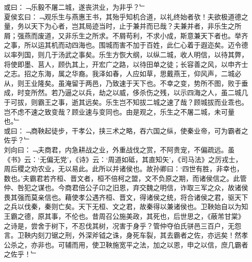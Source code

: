 或曰：﹁乐毅不屠二城，遂丧洪业，为非乎？﹂\\
夏侯玄曰：﹁观乐生与燕惠王书，其殆乎知机合道，以礼终始者欤！夫欲极道德之量，务以天下为心者，岂其局迹当时，止于兼并而已哉？夫兼并者，非乐生之所屑；强燕而废道，又非乐生之所求。不屑苟利，不求小成，斯意兼天下者也。举齐之事，所以运其机而动四海也。围城而害不加于百姓，此仁心着于遐迩矣。迈令德以率列国，则几于汤武之事矣。乐生方恢大纲，以纵二城，收人明信，以待其弊，将使即墨、莒人，顾仇其上，开宏广之路，以待田单之徒；长容善之风，以申齐士之志。招之东海，属之华裔。我泽如春，人应如草，思戴燕王，仰风声，二城必从，则王业隆矣。虽淹留于两邑，乃致速于天下也。不幸之变，势所不图，败于垂成，时变所然。若乃逼之以兵，劫之以威，侈杀伤之残，以示四海之人，虽二城几于可拔，则霸王之事，逝其远矣。乐生岂不知拔二城之速了哉？顾城拔而业乖也。岂不虑不速之致变哉？顾业速与变同也。由是观之，乐生之不屠二城，未可量也。﹂
\\
或曰：﹁商鞅起徒步，干孝公，挟三术之略，吞六国之纵，使秦业帝，可为霸者之佐乎？﹂\\
刘向曰：﹁夫商君，内急耕战之业，外重战伐之赏，不阿贵宠，不偏疏远。虽《书》云：‘无偏无党’，《诗》云：‘周道如砥，其直知矢’，《司马法》之厉戎士，周后稷之劝农业，无以易此。此所以并诸侯也。故孙卿曰：‘四世有胜，非幸也，数也。’夫霸君若齐桓、晋文者，桓不倍柯之盟，文不负原之期，而诸侯信之。此管仲、咎犯之谋也。今商君倍公子卬之旧恩，弃交魏之明信，诈取三军之众，故诸侯畏其强而莫亲信也。藉使孝公遇齐桓、晋文，得诸侯之统，将合诸侯之君，驱天下之兵以伐秦，秦则亡矣。天下无桓、文之君，故秦得以兼诸侯也。卫鞅始自以为知王霸之德，原其事，不伦也。昔周召公施美政，其死也，后世思之，《蔽芾甘棠》之诗是，尝舍于树下，不忍伐其树，况害于身乎？管仲夺伯氏骈邑三百户，无怨言。卫鞅内刻刀锯之刑，外深斧钺之诛，身死车裂，其去霸者之佐，亦远矣！然孝公杀之，亦非也。可辅而用，使卫鞅施宽平之法，加之以恩，申之以信，庶几霸者之佐乎！﹂
